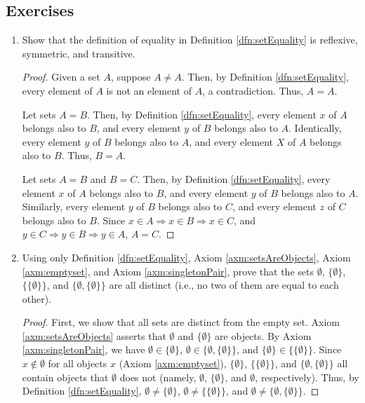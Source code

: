 \documentclass[../main.tex]{subfiles}
\begin{document}
\subsection*{Exercises}
\begin{enumerate}[ref={\thesection.\arabic*}]
    \item \label{exr:3.1.1}Show that the definition of equality in Definition \ref{dfn:setEquality} is reflexive, symmetric, and transitive.
    \begin{proof}
        Given a set $A$, suppose $A\neq A$. Then, by Definition \ref{dfn:setEquality}, every element of $A$ is not an element of $A$, a contradiction. Thus, $A=A$.\par
        Let sets $A=B$. Then, by Definition \ref{dfn:setEquality}, every element $x$ of $A$ belongs also to $B$, and every element $y$ of $B$ belongs also to $A$. Identically, every element $y$ of $B$ belongs also to $A$, and every element $X$ of $A$ belongs also to $B$. Thus, $B=A$.\par
        Let sets $A=B$ and $B=C$. Then, by Definition \ref{dfn:setEquality}, every element $x$ of $A$ belongs also to $B$, and every element $y$ of $B$ belongs also to $A$. Similarly, every element $y$ of $B$ belongs also to $C$, and every element $z$ of $C$ belongs also to $B$. Since $x\in A\Rightarrow x\in B\Rightarrow x\in C$, and $y\in C\Rightarrow y\in B\Rightarrow y\in A$, $A=C$.
    \end{proof}
    \item \label{exr:3.1.2}Using only Definition \ref{dfn:setEquality}, Axiom \ref{axm:setsAreObjects}, Axiom \ref{axm:emptyset}, and Axiom \ref{axm:singletonPair}, prove that the sets $\emptyset$, $\{\emptyset\}$, $\{\{\emptyset\}\}$, and $\{\emptyset,\{\emptyset\}\}$ are all distinct (i.e., no two of them are equal to each other).
    \begin{proof}
        First, we show that all sets are distinct from the empty set. Axiom \ref{axm:setsAreObjects} asserts that $\emptyset$ and $\{\emptyset\}$ are objects. By Axiom \ref{axm:singletonPair}, we have $\emptyset\in\{\emptyset\}$, $\emptyset\in\{\emptyset,\{\emptyset\}\}$, and $\{\emptyset\}\in\{\{\emptyset\}\}$. Since $x\notin\emptyset$ for all objects $x$ (Axiom \ref{axm:emptyset}), $\{\emptyset\}$, $\{\{\emptyset\}\}$, and $\{\emptyset,\{\emptyset\}\}$ all contain objects that $\emptyset$ does not (namely, $\emptyset$, $\{\emptyset\}$, and $\emptyset$, respectively). Thus, by Definition \ref{dfn:setEquality}, $\emptyset\neq\{\emptyset\}$, $\emptyset\neq\{\{\emptyset\}\}$, and $\emptyset\neq\{\emptyset,\{\emptyset\}\}$.\par

\end{proof}
\end{enumerate}
\end{document}
